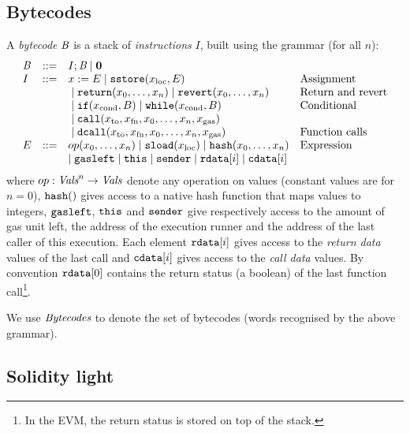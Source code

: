 \documentclass[12pt]{extarticle}
\begin{document}
\subsection{Bytecodes}
A \emph{bytecode} $\textit{B}$ is a stack of \emph{instructions} $I$, built using the grammar (for all $n$):
$$\begin{array}{lcll}
\textit{B} &:: =& I ; \textit{B} \mid \mathbf{0} \\
I & :: =& x:=E \mid \mathtt{sstore}(x_\textrm{loc},E) & \hbox{Assignment} \\
&&{}\mid \mathtt{return}(x_0,\dots,x_n) \mid \mathtt{revert}(x_0,\dots,x_n) & \hbox{Return and revert} \\
&& {}\mid \mathtt{if}(x_\textrm{cond}, B) \mid \mathtt{while}(x_\textrm{cond},B)  & \hbox{Conditional}\\
&&{}\mid \mathtt{call}(x_\textrm{to}, x_\textrm{fn}, x_0, \dots, x_n,x_\textrm{gas})\\
&&{}\mid \mathtt{dcall}(x_\textrm{to}, x_\textrm{fn}, x_0, \dots, x_n,x_\textrm{gas})
 & \hbox{Function calls} \\
E & ::= & op(x_0,\dots,x_n)\mid \mathtt{sload}(x_\textrm{loc})\mid\mathtt{hash}(x_0,\dots,x_n) & \hbox{Expression} \\ 
&& \mid \texttt{gasleft} \mid \texttt{this} \mid \mathtt{sender}\mid \mathtt{rdata}[i] \mid\mathtt{cdata}[i] 
\end{array}
$$
where $op:\textit{Vals}^n\to \textit{Vals}$ denote any operation on values (constant values are for $n=0$), $\mathtt{hash}()$ gives access to a native hash function that maps values to integers, 
$\texttt{gasleft}$, $\texttt{this}$ and $\texttt{sender}$ give respectively access to the amount of gas unit left, the address of the execution runner and the address of the last caller of this execution. 
Each element $\mathtt{rdata}[i]$ gives access to the \emph{return data} values of the last call and 
$\mathtt{cdata}[i]$ gives access to the \emph{call data} values. By convention $\mathtt{rdata}[0]$ contains the return status (a boolean) of the last function call\footnote{In the EVM, the return status is stored on top of the stack.}.

We use $\textit{Bytecodes}$ to denote the set of bytecodes (words recognised by the above grammar).

\subsection{Solidity light}\label{sec:solidity-light}
\end{document}
